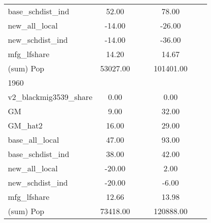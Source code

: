\begin{table}[htbp]
\begin{tabular}{l*{2}{ccc}}
base\_schdist\_ind    &       52.00&            &            &       78.00&            &            \\
new\_all\_local       &      -14.00&            &            &      -26.00&            &            \\
new\_schdist\_ind     &      -14.00&            &            &      -36.00&            &            \\
mfg\_lfshare         &       14.20&            &            &       14.67&            &            \\
(sum) Pop           &    53027.00&            &            &   101401.00&            &            \\
\midrule
1960                &            &            &            &            &            &            \\
v2\_blackmig3539\_share&        0.00&            &            &        0.00&            &            \\
GM                  &        9.00&            &            &       32.00&            &            \\
GM\_hat2             &       16.00&            &            &       29.00&            &            \\
base\_all\_local      &       47.00&            &            &       93.00&            &            \\
base\_schdist\_ind    &       38.00&            &            &       42.00&            &            \\
new\_all\_local       &      -20.00&            &            &        2.00&            &            \\
new\_schdist\_ind     &      -20.00&            &            &       -6.00&            &            \\
mfg\_lfshare         &       12.66&            &            &       13.98&            &            \\
(sum) Pop           &    73418.00&            &            &   120888.00&            &            \\
\bottomrule
\end{tabular}
\end{table}
